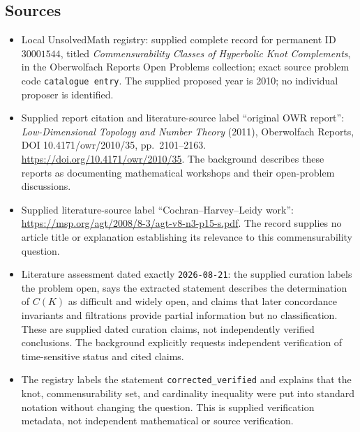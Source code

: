 \documentclass[11pt]{article}
\begin{document}
\subsection{Sources}
\begin{itemize}
\item Local UnsolvedMath registry: supplied complete record for permanent ID \(30001544\), titled \emph{Commensurability Classes of Hyperbolic Knot Complements}, in the Oberwolfach Reports Open Problems collection; exact source problem code \texttt{catalogue entry}. The supplied proposed year is 2010; no individual proposer is identified.
\item Supplied report citation and literature-source label ``original OWR report'': \emph{Low-Dimensional Topology and Number Theory} (2011), Oberwolfach Reports, DOI 10.4171/owr/2010/35, pp.\ 2101--2163. \url{https://doi.org/10.4171/owr/2010/35}. The background describes these reports as documenting mathematical workshops and their open-problem discussions.
\item Supplied literature-source label ``Cochran--Harvey--Leidy work'': \url{https://msp.org/agt/2008/8-3/agt-v8-n3-p15-s.pdf}. The record supplies no article title or explanation establishing its relevance to this commensurability question.
\item Literature assessment dated exactly \texttt{2026-08-21}: the supplied curation labels the problem open, says the extracted statement describes the determination of \(C(K)\) as difficult and widely open, and claims that later concordance invariants and filtrations provide partial information but no classification. These are supplied dated curation claims, not independently verified conclusions. The background explicitly requests independent verification of time-sensitive status and cited claims.
\item The registry labels the statement \texttt{corrected\_verified} and explains that the knot, commensurability set, and cardinality inequality were put into standard notation without changing the question. This is supplied verification metadata, not independent mathematical or source verification.
\end{itemize}
\end{document}
